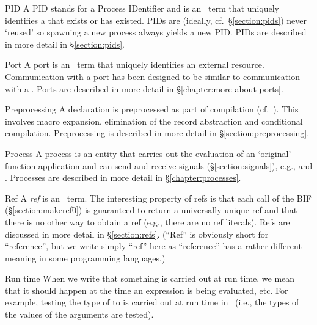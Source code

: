 \begin{Lentry}
\item[PID]
A PID stands for a Process IDentifier and is an \Erlang\ term that
uniquely identifies a  that exists or has existed.  PIDs
are (ideally, cf.\ \S\ref{section:pids}) never `reused' so spawning a
new process always yields a new PID.  PIDs are described in more
detail in \S\ref{section:pids}.

\item[Port]
A port is an \Erlang\ term that uniquely identifies an external
resource.  Communication with a port has been designed to be similar
to communication with a . Ports are described in more
detail in \S\ref{chapter:more-about-ports}.

\item[Preprocessing]
A  declaration is preprocessed as part of compilation (cf.\
).  This involves macro expansion, elimination of the
record abstraction and conditional compilation.  Preprocessing is
described in more detail in \S\ref{section:preprocessing}.

\item[Process]
A process is an entity that carries out the evaluation of an
`original' function application and can send and receive signals
(\S\ref{section:signals}), e.g., \B{messages} and
.  Processes are described in more detail in
\S\ref{chapter:processes}.

\item[Ref]
A \emph{ref} is an \Erlang\ term.  The interesting property of refs is
that each call of the BIF \T{make_ref/0} (\S\ref{section:makeref0}) is
guaranteed to return a universally unique ref and that there is no
other way to obtain a ref (e.g., there are no ref literals).  Refs are
discussed in more detail in \S\ref{section:refs}.  (``Ref'' is
obviously short for ``reference'', but we write simply ``ref'' here as
``reference'' has a rather different meaning in some programming
languages.)

\item[Run time]
When we write that something is carried out at run time, we mean that
it should happen at the time an expression is being evaluated, etc.
For example, testing the type of \B{arguments} to \B{BIFs} is carried
out at run time in \Erlang\ (i.e., the types of the values of the
arguments are tested).


\end{Lentry}
